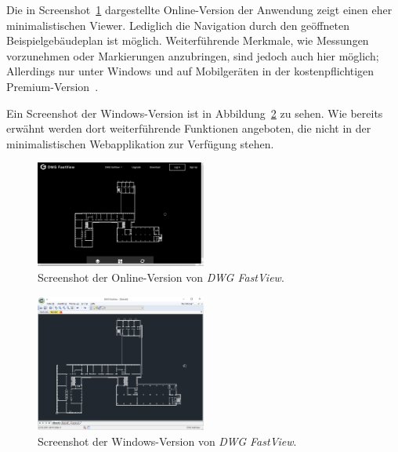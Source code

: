 Die in Screenshot~\ref{fig:dwg-fastview-online} dargestellte Online-Version der Anwendung zeigt einen eher minimalistischen Viewer.
Lediglich die Navigation durch den geöffneten Beispielgebäudeplan ist möglich.
Weiterführende Merkmale, wie Messungen vorzunehmen oder Markierungen anzubringen, sind jedoch auch hier möglich; Allerdings nur unter Windows und auf Mobilgeräten in der kostenpflichtigen Premium-Version~\cite{DWGFastViewPremium}.

Ein Screenshot der Windows-Version ist in Abbildung~\ref{fig:dwg-fastview-windows} zu sehen.
Wie bereits erwähnt werden dort weiterführende Funktionen angeboten, die nicht in der minimalistischen Webapplikation zur Verfügung stehen.

\begin{figure}
    \includegraphics[width=0.5\textwidth]{res/dwg-fastview-online.png}
    \caption{Screenshot der Online-Version von \textit{DWG FastView}.}
    \label{fig:dwg-fastview-online}
\end{figure}

\begin{figure}
    \includegraphics[width=0.5\textwidth]{res/dwg-fastview.png}
    \caption{Screenshot der Windows-Version von \textit{DWG FastView}.}
    \label{fig:dwg-fastview-windows}
\end{figure}
